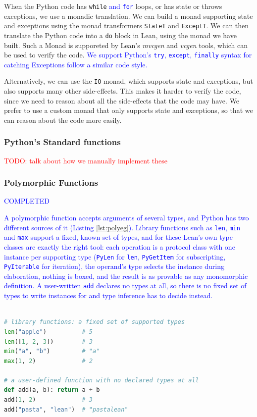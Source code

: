 \documentclass{article}
\newcommand{\code}{\lstinline}
\newcommand{\todo}[1]{\textcolor{red}{TODO: #1}}
\newcommand{\suggest}[1]{\textcolor{blue}{#1}}
\begin{document}
When the Python code has \code{while} \suggest{and \code{for}} loops, or has state or throws exceptions, we use a monadic translation. We can build a monad supporting state and exceptions using the monad transformers \code{StateT} and \code{ExceptT}. We can then translate the Python code into a \code{do} block in Lean, using the monad we have built. Such a Monad is supporeted by Lean's \emph{mvcgen} and \emph{vcgen} tools, which can be used to verify the code. \suggest{We support Python's \code{try}, \code{except}, \code{finally} syntax for catching Exceptions follow a similar code style.}

Alternatively, we can use the \code{IO} monad, which supports state and exceptions, but also supports many other side-effects. This makes it harder to verify the code, since we need to reason about all the side-effects that the code may have. We prefer to use a custom monad that only supports state and exceptions, so that we can reason about the code more easily.

\subsubsection{Python's Standard functions}

\todo{talk about how we manually implement these}

\subsubsection{Polymorphic Functions}\label{sec:poly}
\suggest{COMPLETED}


\suggest{A polymorphic function accepts arguments of several types, and Python has two different sources of it (Listing \ref{lst:polyeg}). Library functions such as \code{len}, \code{min} and \code{max} support a fixed, known set of types, and for these Lean's own type classes are exactly the right tool: each operation is a protocol class with one instance per supporting type (\code{PyLen} for \code{len}, \code{PyGetItem} for subscripting, \code{PyIterable} for iteration), the operand's type selects the instance during elaboration, nothing is boxed, and the result is as provable as any monomorphic definition. A user-written \code{add} declares no types at all, so there is no fixed set of types to write instances for and type inference has to decide instead.}

\begin{lstlisting}[language=python, caption={Two sources of polymorphism in Python.}, label={lst:polyeg}, breaklines=true]

# library functions: a fixed set of supported types
len("apple")          # 5
len([1, 2, 3])        # 3
min("a", "b")         # "a"
max(1, 2)             # 2

# a user-defined function with no declared types at all
def add(a, b): return a + b
add(1, 2)             # 3
add("pasta", "lean")  # "pastalean"
\end{lstlisting}
\end{document}

